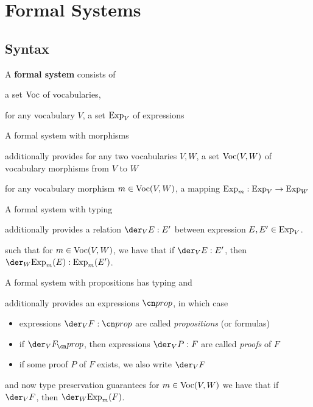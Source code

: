 \section{Formal Systems}


\subsection{Syntax}

\begin{definition}\label{def:css}
A \textbf{formal system} consists of
\begin{compactitem}
 \item a set $\mathrm{Voc}$ of vocabularies,
 \item for any vocabulary $V$, a set $\mathrm{Exp}_V$ of expressions
\end{compactitem}

A formal system with morphisms
\begin{compactitem}
 \item additionally provides for any two vocabularies $V,W$, a set $\mathrm{Voc}(V,W)$ of vocabulary morphisms from $V$ to $W$
 \item for any vocabulary morphism $m\in\mathrm{Voc}(V,W)$, a mapping $\mathrm{Exp}_m:\mathrm{Exp}_V\to \mathrm{Exp}_W$
\end{compactitem}

A formal system with typing
\begin{compactitem}
\item additionally provides a relation $\der_V E:E'$ between expression $E,E'\in\mathrm{Exp}_V$.
\item such that for $m\in\mathrm{Voc}(V,W)$, we have that if $\der_V E:E'$, then $\der_W \Exp_m(E):\Exp_m(E')$.
\end{compactitem}

A formal system with propositions has typing and
\begin{compactitem}
\item additionally provides an expressions $\prop$, in which case
 \begin{itemize}
 \item expressions $\der_V F:\prop$ are called \emph{propositions} (or formulas)
 \item if $\der_V F_\prop$, then expressions $\der_V P:F$ are called \emph{proofs} of $F$
 \item if some proof $P$ of $F$ exists, we also write $\der_V F$
 \end{itemize}
\item and now type preservation guarantees for $m\in\mathrm{Voc}(V,W)$ we have that if $\der_V F$, then $\der_W \Exp_m(F)$.
\end{compactitem}


\end{definition}

